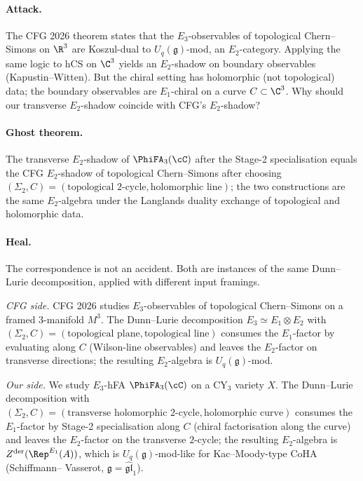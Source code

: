 \paragraph{Attack.}  The CFG 2026 theorem states that the $E_3$-observables
of topological Chern--Simons on $\R^3$ are Koszul-dual to
$U_q(\mathfrak g)$-mod, an $E_2$-category.  Applying the same logic to
hCS on $\C^3$ yields an $E_2$-shadow on boundary observables
(Kapustin--Witten).  But the chiral setting has holomorphic (not
topological) data; the boundary observables are $E_1$-chiral on a
curve $C \subset \C^3$.  Why should our transverse $E_2$-shadow
coincide with CFG's $E_2$-shadow?

\paragraph{Ghost theorem.}  The transverse $E_2$-shadow of
$\PhiFA_3(\cC)$ after the Stage-2 specialisation equals the
CFG $E_2$-shadow of topological Chern--Simons after choosing
$(\Sigma_2, C) = (\text{topological 2-cycle}, \text{holomorphic line})$;
the two constructions are the same $E_2$-algebra under the Langlands
duality exchange of topological and holomorphic data.

\paragraph{Heal.}  The correspondence is not an accident.  Both are
instances of the same Dunn--Lurie decomposition, applied with different
input framings.

\emph{CFG side.}  CFG 2026 studies $E_3$-observables of topological
Chern--Simons on a framed $3$-manifold $M^3$.  The Dunn--Lurie
decomposition $E_3 \simeq E_1 \otimes E_2$ with $(\Sigma_2, C) =
(\text{topological plane}, \text{topological line})$ consumes the
$E_1$-factor by evaluating along $C$ (Wilson-line observables) and
leaves the $E_2$-factor on transverse directions; the resulting
$E_2$-algebra is $U_q(\mathfrak g)$-mod.

\emph{Our side.}  We study $E_3$-hFA $\PhiFA_3(\cC)$ on a CY$_3$
variety $X$.  The Dunn--Lurie decomposition with
$(\Sigma_2, C) = (\text{transverse holomorphic } 2\text{-cycle},
\text{holomorphic curve})$ consumes the $E_1$-factor by Stage-2
specialisation along $C$ (chiral factorisation along the curve) and
leaves the $E_2$-factor on the transverse $2$-cycle; the resulting
$E_2$-algebra is $Z^{\mathrm{der}}(\Rep^{E_1}(A))$, which is
$U_q(\mathfrak g)$-mod-like for Kac--Moody-type CoHA (Schiffmann--
Vasserot, $\mathfrak g = \widehat{\mathfrak{gl}}_1$).

